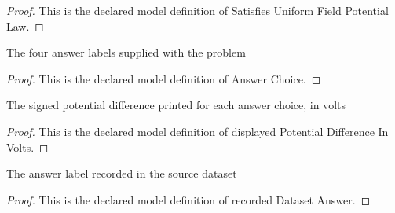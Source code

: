 \begin{proof}
  This is the declared model definition of Satisfies Uniform Field Potential Law.
\end{proof}
\begin{definition}
  \label{def:physics:phyx-mini-0874:phyxminiproblems-problemphyxmini0874-answerchoice}
  The four answer labels supplied with the problem
\end{definition}
\begin{proof}
  This is the declared model definition of Answer Choice.
\end{proof}
\begin{definition}
  \label{def:physics:phyx-mini-0874:phyxminiproblems-problemphyxmini0874-answerchoice-displayedpotentialdifferenceinvolts}
  The signed potential difference printed for each answer choice, in volts
\end{definition}
\begin{proof}
  This is the declared model definition of displayed Potential Difference In Volts.
\end{proof}
\begin{definition}
  \label{def:physics:phyx-mini-0874:phyxminiproblems-problemphyxmini0874-recordeddatasetanswer}
  The answer label recorded in the source dataset
\end{definition}
\begin{proof}
  This is the declared model definition of recorded Dataset Answer.
\end{proof}
